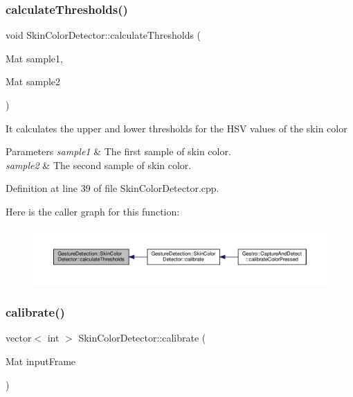 \subsubsection{\texorpdfstring{calculate\+Thresholds()}{calculateThresholds()}}
{\footnotesize\ttfamily void Skin\+Color\+Detector\+::calculate\+Thresholds (\begin{DoxyParamCaption}\item[{Mat}]{sample1,  }\item[{Mat}]{sample2 }\end{DoxyParamCaption})\hspace{0.3cm}{\ttfamily [private]}}

It calculates the upper and lower thresholds for the H\+SV values of the skin color


\begin{DoxyParams}{Parameters}
{\em sample1} & The first sample of skin color. \\
\hline
{\em sample2} & The second sample of skin color. \\
\hline
\end{DoxyParams}


Definition at line 39 of file Skin\+Color\+Detector.\+cpp.

Here is the caller graph for this function\+:
\nopagebreak
\begin{figure}[H]
\begin{center}
\leavevmode
\includegraphics[width=350pt]{class_gesture_detection_1_1_skin_color_detector_abcb6b9a3ef251dbafb6bca73ae0929f8_icgraph}
\end{center}
\end{figure}
\mbox{\label{class_gesture_detection_1_1_skin_color_detector_ae8b3880d1d75b07e356cd7d1ff128ed9}} 
\subsubsection{\texorpdfstring{calibrate()}{calibrate()}}
{\footnotesize\ttfamily vector$<$ int $>$ Skin\+Color\+Detector\+::calibrate (\begin{DoxyParamCaption}\item[{Mat}]{input\+Frame }\end{DoxyParamCaption})}

